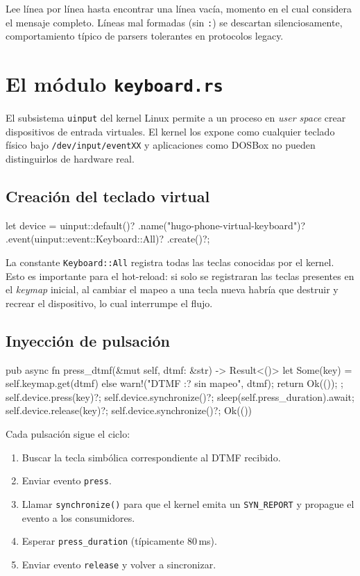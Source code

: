 Lee línea por línea hasta encontrar una línea vacía, momento en el cual considera el mensaje completo. Líneas mal formadas (sin \texttt{:}) se descartan silenciosamente, comportamiento típico de parsers tolerantes en protocolos legacy.

\section{El módulo \texttt{keyboard.rs}}

El subsistema \texttt{uinput} del kernel Linux permite a un proceso en \emph{user space} crear dispositivos de entrada virtuales. El kernel los expone como cualquier teclado físico bajo \texttt{/dev/input/eventXX} y aplicaciones como DOSBox no pueden distinguirlos de hardware real.

\subsection{Creación del teclado virtual}

\begin{rustcode}
let device = uinput::default()?
    .name("hugo-phone-virtual-keyboard")?
    .event(uinput::event::Keyboard::All)?
    .create()?;
\end{rustcode}

La constante \texttt{Keyboard::All} registra todas las teclas conocidas por el kernel. Esto es importante para el hot-reload: si solo se registraran las teclas presentes en el \emph{keymap} inicial, al cambiar el mapeo a una tecla nueva habría que destruir y recrear el dispositivo, lo cual interrumpe el flujo.

\subsection{Inyección de pulsación}

\begin{rustcode}
pub async fn press_dtmf(&mut self, dtmf: &str) -> Result<()> {
    let Some(key) = self.keymap.get(dtmf) else {
        warn!("DTMF {:?} sin mapeo", dtmf);
        return Ok(());
    };
    self.device.press(key)?;
    self.device.synchronize()?;
    sleep(self.press_duration).await;
    self.device.release(key)?;
    self.device.synchronize()?;
    Ok(())
}
\end{rustcode}

Cada pulsación sigue el ciclo:

\begin{enumerate}
  \item Buscar la tecla simbólica correspondiente al DTMF recibido.
  \item Enviar evento \texttt{press}.
  \item Llamar \texttt{synchronize()} para que el kernel emita un \texttt{SYN\_REPORT} y propague el evento a los consumidores.
  \item Esperar \texttt{press\_duration} (típicamente 80\,ms).
  \item Enviar evento \texttt{release} y volver a sincronizar.
\end{enumerate}

